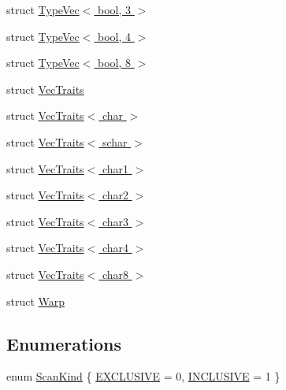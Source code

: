\begin{DoxyCompactItemize}
struct \hyperlink{structcv_1_1gpu_1_1device_1_1TypeVec_3_01bool_00_013_01_4}{Type\-Vec$<$ bool, 3 $>$}
\item 
struct \hyperlink{structcv_1_1gpu_1_1device_1_1TypeVec_3_01bool_00_014_01_4}{Type\-Vec$<$ bool, 4 $>$}
\item 
struct \hyperlink{structcv_1_1gpu_1_1device_1_1TypeVec_3_01bool_00_018_01_4}{Type\-Vec$<$ bool, 8 $>$}
\item 
struct \hyperlink{structcv_1_1gpu_1_1device_1_1VecTraits}{Vec\-Traits}
\item 
struct \hyperlink{structcv_1_1gpu_1_1device_1_1VecTraits_3_01char_01_4}{Vec\-Traits$<$ char $>$}
\item 
struct \hyperlink{structcv_1_1gpu_1_1device_1_1VecTraits_3_01schar_01_4}{Vec\-Traits$<$ schar $>$}
\item 
struct \hyperlink{structcv_1_1gpu_1_1device_1_1VecTraits_3_01char1_01_4}{Vec\-Traits$<$ char1 $>$}
\item 
struct \hyperlink{structcv_1_1gpu_1_1device_1_1VecTraits_3_01char2_01_4}{Vec\-Traits$<$ char2 $>$}
\item 
struct \hyperlink{structcv_1_1gpu_1_1device_1_1VecTraits_3_01char3_01_4}{Vec\-Traits$<$ char3 $>$}
\item 
struct \hyperlink{structcv_1_1gpu_1_1device_1_1VecTraits_3_01char4_01_4}{Vec\-Traits$<$ char4 $>$}
\item 
struct \hyperlink{structcv_1_1gpu_1_1device_1_1VecTraits_3_01char8_01_4}{Vec\-Traits$<$ char8 $>$}
\item 
struct \hyperlink{structcv_1_1gpu_1_1device_1_1Warp}{Warp}
\end{DoxyCompactItemize}
\subsection*{Enumerations}
\begin{DoxyCompactItemize}
\item 
enum \hyperlink{namespacecv_1_1gpu_1_1device_a28816cb295b05f754b37820576d20aef}{Scan\-Kind} \{ \hyperlink{namespacecv_1_1gpu_1_1device_a28816cb295b05f754b37820576d20aefae83736994a983eeaefe370cb672d0390}{E\-X\-C\-L\-U\-S\-I\-V\-E} = 0, 
\hyperlink{namespacecv_1_1gpu_1_1device_a28816cb295b05f754b37820576d20aefa2c3c91d1e8338cd34af5d45feb97bdf7}{I\-N\-C\-L\-U\-S\-I\-V\-E} = 1
 \}
\end{DoxyCompactItemize}
